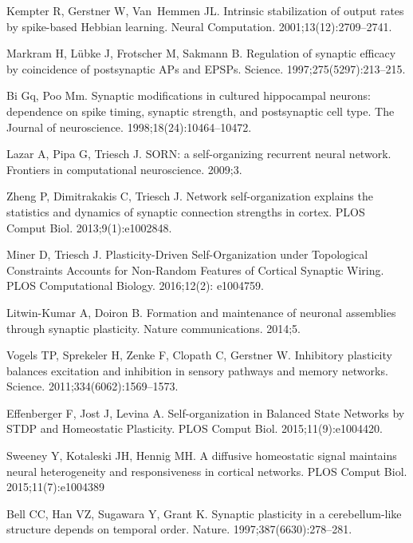\documentclass[10pt,letterpaper]{article}
\begin{document}
\begin{thebibliography}{10}
Kempter R, Gerstner W, Van~Hemmen JL.
\newblock Intrinsic stabilization of output rates by spike-based Hebbian
  learning.
\newblock Neural Computation. 2001;13(12):2709--2741.

Markram H, L{\"u}bke J, Frotscher M, Sakmann B.
\newblock Regulation of synaptic efficacy by coincidence of postsynaptic APs
  and EPSPs.
\newblock Science. 1997;275(5297):213--215.

Bi Gq, Poo Mm.
\newblock Synaptic modifications in cultured hippocampal neurons: dependence on
  spike timing, synaptic strength, and postsynaptic cell type.
\newblock The Journal of neuroscience. 1998;18(24):10464--10472.

Lazar A, Pipa G, Triesch J.
\newblock SORN: a self-organizing recurrent neural network.
\newblock Frontiers in computational neuroscience. 2009;3.

Zheng P, Dimitrakakis C, Triesch J.
\newblock Network self-organization explains the statistics and dynamics of
  synaptic connection strengths in cortex.
\newblock PLOS Comput Biol. 2013;9(1):e1002848.

Miner D, Triesch J.
\newblock Plasticity-Driven Self-Organization under Topological Constraints
  Accounts for Non-Random Features of Cortical Synaptic Wiring.
\newblock PLOS Computational Biology. 2016;12(2): e1004759.

Litwin-Kumar A, Doiron B.
\newblock Formation and maintenance of neuronal assemblies through synaptic
  plasticity.
\newblock Nature communications. 2014;5.

Vogels TP, Sprekeler H, Zenke F, Clopath C, Gerstner W.
\newblock Inhibitory plasticity balances excitation and inhibition in sensory
  pathways and memory networks.
\newblock Science. 2011;334(6062):1569--1573.

Effenberger F, Jost J, Levina A.
\newblock Self-organization in Balanced State Networks by STDP and Homeostatic
  Plasticity.
\newblock PLOS Comput Biol. 2015;11(9):e1004420.

Sweeney Y, Kotaleski JH, Hennig MH.
\newblock A diffusive homeostatic signal maintains neural heterogeneity and responsiveness in cortical networks.
\newblock PLOS Comput Biol. 2015;11(7):e1004389

Bell CC, Han VZ, Sugawara Y, Grant K.
\newblock Synaptic plasticity in a cerebellum-like structure depends on
  temporal order.
\newblock Nature. 1997;387(6630):278--281.


\end{thebibliography}
\end{document}
